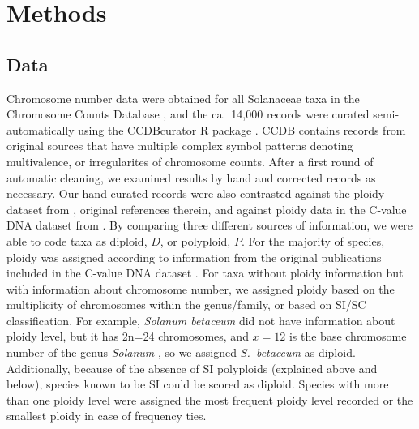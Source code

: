 \section{Methods}

\subsection{Data}


Chromosome number data were obtained for all Solanaceae taxa in the Chromosome Counts Database \citep[CCDB;][]{rice_2015}, and the ca.~14,000 records were curated semi-automatically using the \mbox{CCDBcurator} R package \citep{rivero_2019}.
CCDB contains records from original sources that have multiple complex symbol patterns denoting multivalence, or irregularites of chromosome counts.
After a first round of automatic cleaning, we examined results by hand and corrected records as necessary.
Our hand-curated records were also contrasted against the ploidy dataset from \citet{robertson_2011}, original references therein, and against ploidy data in the C-value DNA dataset from \citet{bennett_2005}.
By comparing three different sources of information, we were able to code taxa as diploid, $D$, or polyploid, $P$.
For the majority of species, ploidy was assigned according to information from the original publications included in the  C-value DNA dataset \citep{bennett_2005}.
For taxa without ploidy information but with information about chromosome number, we assigned ploidy based on the multiplicity of chromosomes within the genus/family, or based on SI/SC classification.
For example, \textit{Solanum betaceum} did not have information about ploidy level, but it has 2n=24 chromosomes, and  $x=12$ is the base chromosome number of the genus \textit{Solanum} \citep{olmstead_2007}, so we assigned \textit{S.~betaceum} as diploid. 
Additionally, because of the absence of SI polyploids (explained above and below), species known to be SI could be scored as diploid.
Species with more than one ploidy level were assigned the most frequent ploidy level recorded or the smallest ploidy in case of frequency ties.

